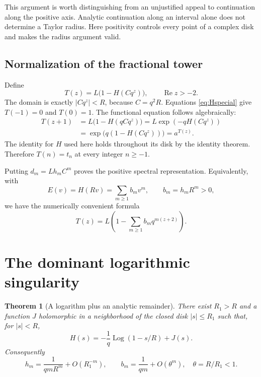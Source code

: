 \documentclass[11pt,letterpaper]{article}
\newtheorem{theorem}{Theorem}[section]
\theoremstyle{definition}\newtheorem{definition}[theorem]{Definition}
\theoremstyle{remark}\newtheorem{remark}[theorem]{Remark}
\newcommand{\Ree}{\operatorname{Re}}
\newcommand{\Log}{\operatorname{Log}}
\numberwithin{equation}{section}
\begin{document}
This argument is worth distinguishing from an unjustified appeal to continuation along the positive axis. Analytic continuation along an interval alone does not determine a Taylor radius. Here positivity controls every point of a complex disk and makes the radius argument valid.

\subsection{Normalization of the fractional tower}
Define
\begin{equation}\label{eq:Tconstruct}
 T(z)=L\bigl(1-H(Cq^z)\bigr),\qquad \Ree z>-2.
\end{equation}
The domain is exactly $|Cq^z|<R$, because $C=q^2R$. Equations \eqref{eq:Hspecial} give $T(-1)=0$ and $T(0)=1$. The functional equation follows algebraically:
\begin{align*}
 T(z+1)&=L\bigl(1-H(qCq^z)\bigr)
 =L\exp(-qH(Cq^z))\\
 &=\exp\bigl(q(1-H(Cq^z))\bigr)=a^{T(z)}.
\end{align*}
The identity for $H$ used here holds throughout its disk by the identity theorem. Therefore $T(n)=t_n$ at every integer $n\geq-1$.

Putting $d_m=Lh_mC^m$ proves the positive spectral representation. Equivalently, with
\begin{equation}\label{eq:bdef}
 E(v)=H(Rv)=\sum_{m\geq1}b_mv^m,\qquad b_m=h_mR^m>0,
\end{equation}
we have the numerically convenient formula
\begin{equation}\label{eq:Tscaled}
 T(z)=L\left(1-\sum_{m\geq1}b_m q^{m(z+2)}\right).
\end{equation}

\section{The dominant logarithmic singularity}\label{sec:singularity}

\begin{theorem}[A logarithm plus an analytic remainder]\label{thm:logsing}
There exist $R_1>R$ and a function $J$ holomorphic in a neighborhood of the closed disk $|s|\leq R_1$ such that, for $|s|<R$,
\begin{equation}\label{eq:logsplit}
 H(s)=-\frac1q\Log(1-s/R)+J(s).
\end{equation}
Consequently
\begin{equation}\label{eq:hasympt}
 h_m=\frac{1}{qmR^m}+O(R_1^{-m}),\qquad
 b_m=\frac{1}{qm}+O(\theta^m),\quad \theta=R/R_1<1.
\end{equation}
\end{theorem}
\end{document}
